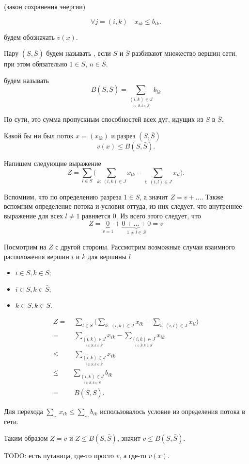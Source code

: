 (закон сохранения энергии)

\[
\forall j = (i, k) \quad x_{ik} \le b_{ik}.
\]


 будем обозначать $v(x)$.


Пару $(S, \bar{S})$ будем называть , если $S$ и $\bar{S}$ разбивают множество вершин сети, при этом обязательно $1 \in S$, $n \in \bar{S}$.


 будем называть
\[
B(S, \bar{S}) = \sum_{\underset{i \in S, k \in \bar{S}}{(i, k) \in J}} b_{ik}
\]

По сути, это сумма пропускным способностей всех дуг, идущих из $S$ в $\bar{S}$.


Какой бы ни был поток $x = (x_{ik})$ и разрез $(S, \bar{S})$
\[
v(x) \le B(S, \bar{S}).
\]

\prooof

Напишем следующие выражение
\[
Z = \sum_{l \in S} \bigg(\sum_{k:\;(l, k) \in J} x_{lk} - \sum_{i: \; (i, l) \in J} x_{il}\bigg).
\]

Вспомним, что по определению разреза $1 \in S$, а значит $Z = v + \dots$. Также вспомним определение потока и условия оттуда, из них следует, что внутреннее выражение для всех $l \neq 1$ равняется $0$. Из всего этого следует, что
\[
Z = \underbrace{0}_{v = 1} + \underbrace{0 + \dots + 0}_{1 \neq l \in S} = v
\]

Посмотрим на $Z$ с другой стороны. Рассмотрим возможные случаи взаимного расположения вершин $i$ и $k$ для вершины $l$

\begin{itemize}[nosep]
	\item $i \in S, k \in S$;
	
	\item $i \in S, k \in \bar{S}$;
	
	\item $k \in S, k \in S$.
\end{itemize}

\begin{align*}
	Z =& \; \sum_{l \in S} \bigg(\sum_{k:\;(l, k) \in J} x_{lk} - \sum_{i: \; (i, l) \in J} x_{il}\bigg) \\
	=& \;  \sum_{\underset{i \in S, k \in \bar{S}}{(i, k) \in J}} x_{ik} - \sum_{\underset{i \in \bar{S}, k \in S}{(i, k) \in J}} x_{ik} \\
	\le& \; \sum_{\underset{i \in S, k \in \bar{S}}{(i, k) \in J}} x_{ik} \\
	\le& \sum_{\underset{i \in S, k \in \bar{S}}{(i, k) \in J}} b_{ik} \\
	=& \; B(S, \bar{S}).
\end{align*}

Для перехода $\sum_{\dots}x_{ik} \le \sum_{\dots} b_{ik}$ использовалось условие из определения потока в сети.

Таким образом $Z = v$ и $Z \le B(S, \bar{S})$, значит $v \le B(S, \bar{S})$.

TODO: есть путаница, где-то просто $v$, а где-то $v(x)$.

